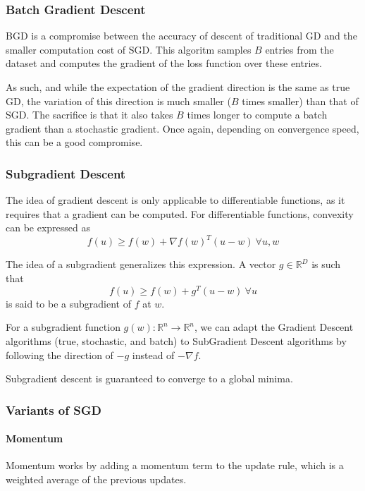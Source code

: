 \documentclass{article}
\newcommand{\R}{\mathbb{R}}
\begin{document}
\subsubsection{Batch Gradient Descent} 

BGD is a compromise between the accuracy of descent of traditional GD and the smaller computation cost of SGD. 
This algoritm samples $B$ entries from the dataset and computes the gradient of the loss function over these entries.

As such, and while the expectation of the gradient direction is the same as true GD, the variation of this direction is much smaller ($B$ times smaller) than that of SGD.
The sacrifice is that it also takes $B$ times longer to compute a batch gradient than a stochastic gradient.
Once again, depending on convergence speed, this can be a good compromise.

\subsubsection{Subgradient Descent}

The idea of gradient descent is only applicable to differentiable functions, as it requires that a gradient can be computed.
For differentiable functions, convexity can be expressed as
$$
f(u) \geq f(w) + \nabla f(w)^T (u-w) \ \forall u,w
$$

The idea of a subgradient generalizes this expression.
A vector $g \in \R^D$ is such that
$$
f(u) \geq f(w) + g^T (u - w) \ \forall u
$$
is said to be a subgradient of $f$ at $w$.

For a subgradient function $g(w): \R^n \to \R^n$, we can adapt the Gradient Descent algorithms (true, stochastic, and batch) to SubGradient Descent algorithms by following the direction of $-g$ instead of $-\nabla f$.

Subgradient descent is guaranteed to converge to a global minima.

\subsubsection{Variants of SGD}

\paragraph{Momentum}

Momentum works by adding a momentum term to the update rule, which is a weighted average of the previous updates.
\end{document}
